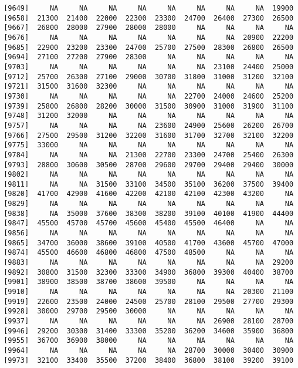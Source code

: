 \documentclass[]{article}
\begin{document}
\begin{verbatim}
 [9649]     NA     NA     NA     NA     NA     NA     NA     NA  19900
 [9658]  21300  21400  22000  22300  23300  24700  26400  27300  26500
 [9667]  26800  28000  27900  28000  28000     NA     NA     NA     NA
 [9676]     NA     NA     NA     NA     NA     NA     NA  20900  22200
 [9685]  22900  23200  23300  24700  25700  27500  28300  26800  26500
 [9694]  27100  27200  27900  28300     NA     NA     NA     NA     NA
 [9703]     NA     NA     NA     NA     NA     NA  23100  24400  25000
 [9712]  25700  26300  27100  29000  30700  31800  31000  31200  32100
 [9721]  31500  31600  32300     NA     NA     NA     NA     NA     NA
 [9730]     NA     NA     NA     NA     NA  22700  24000  24600  25200
 [9739]  25800  26800  28200  30000  31500  30900  31000  31900  31100
 [9748]  31200  32000     NA     NA     NA     NA     NA     NA     NA
 [9757]     NA     NA     NA     NA  23600  24900  25600  26200  26700
 [9766]  27500  29500  31200  32200  31600  31700  32700  32100  32200
 [9775]  33000     NA     NA     NA     NA     NA     NA     NA     NA
 [9784]     NA     NA     NA  21300  22700  23300  24700  25400  26300
 [9793]  28800  30600  30500  28700  29600  29700  29400  29400  30000
 [9802]     NA     NA     NA     NA     NA     NA     NA     NA     NA
 [9811]     NA     NA  31500  33100  34500  35100  36200  37500  39400
 [9820]  41700  42900  41600  42200  42100  42100  42300  43200     NA
 [9829]     NA     NA     NA     NA     NA     NA     NA     NA     NA
 [9838]     NA  35000  37600  38300  38200  39100  40100  41900  44400
 [9847]  45500  45700  45700  45600  45400  45500  46400     NA     NA
 [9856]     NA     NA     NA     NA     NA     NA     NA     NA     NA
 [9865]  34700  36000  38600  39100  40500  41700  43600  45700  47000
 [9874]  45500  46600  46800  46800  47500  48500     NA     NA     NA
 [9883]     NA     NA     NA     NA     NA     NA     NA     NA  29200
 [9892]  30800  31500  32300  33300  34900  36800  39300  40400  38700
 [9901]  38900  38500  38700  38600  39500     NA     NA     NA     NA
 [9910]     NA     NA     NA     NA     NA     NA     NA  20300  21100
 [9919]  22600  23500  24000  24500  25700  28100  29500  27700  29300
 [9928]  30000  29700  29500  30000     NA     NA     NA     NA     NA
 [9937]     NA     NA     NA     NA     NA     NA  26900  28100  28700
 [9946]  29200  30300  31400  33300  35200  36200  34600  35900  36800
 [9955]  36700  36900  38000     NA     NA     NA     NA     NA     NA
 [9964]     NA     NA     NA     NA     NA  28700  30000  30400  30900
 [9973]  32100  33400  35500  37200  38400  36800  38100  39200  39100

\end{verbatim}
\end{document}
